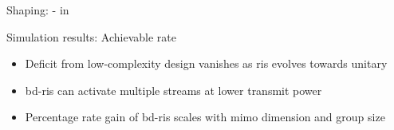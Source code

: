 \documentclass[presentation,xcolor={table},9pt]{beamer}
\begin{document}
\begin{section}{Shaping: - in }
	\begin{frame}{Simulation results: Achievable rate}
		\begin{figure}
			\centering
			\label{fg:rate}
		\end{figure}
		\vspace{1em}
		\begin{itemize}
			\item Deficit from low-complexity design vanishes as \gls{ris} evolves towards unitary
			\item \gls{bd}-\gls{ris} can activate multiple streams at lower transmit power
			\item Percentage rate gain of \gls{bd}-\gls{ris} scales with \gls{mimo} dimension and group size
		\end{itemize}
	\end{frame}
\end{section}
\end{document}
